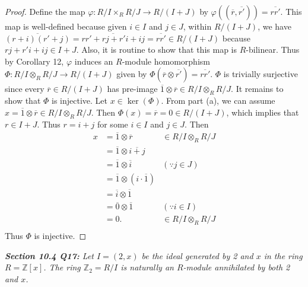 \documentclass{article}
\begin{document}
\begin{enumerate}[label={(\alph*)}]
      \begin{proof}
        Define the map $\varphi:R/I\times_R R/J \rightarrow R/(I+J)$ by
        $\varphi((\overline{r},\overline{r'})) =\overline{rr'}$. This map
        is well-defined because given $i\in I$ and $j\in J$, within
        $R/(I+J)$, we have $\overline{(r+i)(r'+j)}
        =\overline{rr'+rj+r'i+ij} =\overline{rr'} \in R/(I+J)$ because
        $rj+r'i+ij\in I+J$. Also, it is routine to show that this map is
        $R$-bilinear. Thus by Corollary 12, $\varphi$ induces an $R$-module
        homomorphism $\Phi:R/I\otimes_R R/J \rightarrow R/(I+J)$ given by
        $\Phi(\overline{r}\otimes\overline{r'}) =\overline{rr'}$. $\Phi$ is
        trivially surjective since every $\overline{r}\in R/(I+J)$ has
        pre-image $\overline{1}\otimes\overline{r} \in R/I\otimes_R R/J$.
        It remains to show that $\Phi$ is injective. Let $x\in\ker(\Phi)$.
        From part (a), we can assume $x=\overline{1}\otimes\overline{r} \in
        R/I\otimes_R R/J$. Then $\Phi(x) =\overline{r}=0\in R/(I+J)$,
        which implies that $r\in I+J$. Thus $r=i+j$ for some $i\in I$ and
        $j\in J$. Then
        \begin{align*}
          x &=\overline{1}\otimes\overline{r} &\in R/I\otimes_R R/J\\
          &=\overline{1}\otimes\overline{i+j}\\
          &=\overline{1}\otimes\overline{i} &(\because j\in J)\\
          &=\overline{1}\otimes(i\cdot\overline{1})\\
          &=\overline{i}\otimes\overline{1}\\
          &=\overline{0}\otimes\overline{1} &(\because i\in I)\\
          &=0. &\in R/I\otimes_R R/J\\
        \end{align*}
        Thus $\Phi$ is injective.
      \end{proof}
  \end{enumerate}

\it \textbf{Section 10.4 Q17:} Let $I=(2,x)$ be the ideal generated by 2
  and $x$ in the ring $R=\mathbb{Z}[x]$. The ring $\mathbb{Z}_2=R/I$ is
  naturally an $R$-module annihilated by both 2 and $x$.
\end{document}
